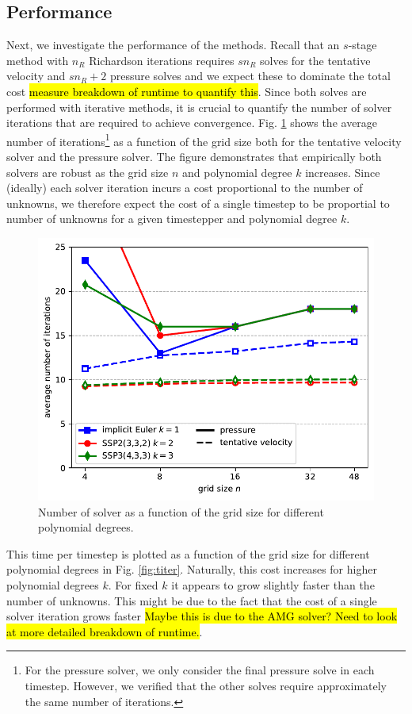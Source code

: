 \documentclass[11pt]{article}
\begin{document}
\subsection{Performance}
Next, we investigate the performance of the methods. Recall that an $s$-stage method with $n_R$ Richardson iterations requires $sn_R$ solves for the tentative velocity and $sn_R+2$ pressure solves and we expect these to dominate the total cost \hl{measure breakdown of runtime to quantify this}. Since both solves are performed with iterative methods, it is crucial to quantify the number of solver iterations that are required to achieve convergence. Fig. \ref{fig:niter} shows the average number of iterations\footnote{For the pressure solver, we only consider the final pressure solve in each timestep. However, we verified that the other solves require approximately the same number of iterations.} as a function of the grid size both for the tentative velocity solver and the pressure solver. The figure demonstrates that empirically both solvers are robust as the grid size $n$ and polynomial degree $k$ increases. Since (ideally) each solver iteration incurs a cost proportional to the number of unknowns, we therefore expect the cost of a single timestep to be proportial to number of unknowns for a given timestepper and polynomial degree $k$.
\begin{figure}
    \begin{center}
        \includegraphics[width=0.75\linewidth]{figures/niter.pdf}
        \caption{Number of solver as a function of the grid size for different polynomial degrees.}
        \label{fig:niter}
    \end{center}
\end{figure}
This time per timestep is plotted as a function of the grid size for different polynomial degrees in Fig. \ref{fig:titer}. Naturally, this cost increases for higher polynomial degrees $k$. For fixed $k$ it appears to grow slightly faster than the number of unknowns. This might be due to the fact that the cost of a single solver iteration grows faster \hl{Maybe this is due to the AMG solver? Need to look at more detailed breakdown of runtime.}.
\end{document}
